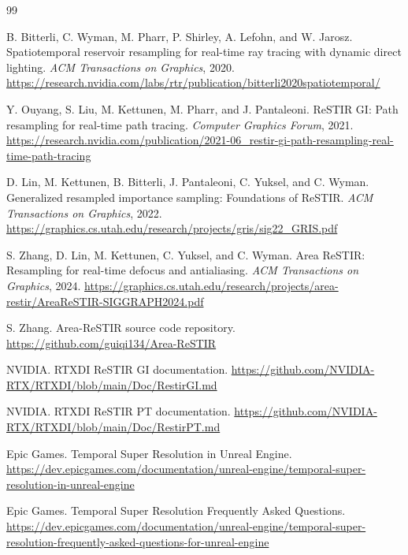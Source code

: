 \documentclass[11pt]{article}
\begin{document}
\clearpage
\begin{thebibliography}{99}
\small

B. Bitterli, C. Wyman, M. Pharr, P. Shirley, A. Lefohn, and W. Jarosz.
\newblock Spatiotemporal reservoir resampling for real-time ray tracing with dynamic direct lighting.
\newblock \emph{ACM Transactions on Graphics}, 2020.
\newblock \url{https://research.nvidia.com/labs/rtr/publication/bitterli2020spatiotemporal/}

Y. Ouyang, S. Liu, M. Kettunen, M. Pharr, and J. Pantaleoni.
\newblock ReSTIR GI: Path resampling for real-time path tracing.
\newblock \emph{Computer Graphics Forum}, 2021.
\newblock \url{https://research.nvidia.com/publication/2021-06_restir-gi-path-resampling-real-time-path-tracing}

D. Lin, M. Kettunen, B. Bitterli, J. Pantaleoni, C. Yuksel, and C. Wyman.
\newblock Generalized resampled importance sampling: Foundations of ReSTIR.
\newblock \emph{ACM Transactions on Graphics}, 2022.
\newblock \url{https://graphics.cs.utah.edu/research/projects/gris/sig22_GRIS.pdf}

S. Zhang, D. Lin, M. Kettunen, C. Yuksel, and C. Wyman.
\newblock Area ReSTIR: Resampling for real-time defocus and antialiasing.
\newblock \emph{ACM Transactions on Graphics}, 2024.
\newblock \url{https://graphics.cs.utah.edu/research/projects/area-restir/AreaReSTIR-SIGGRAPH2024.pdf}

S. Zhang.
\newblock Area-ReSTIR source code repository.
\newblock \url{https://github.com/guiqi134/Area-ReSTIR}

NVIDIA.
\newblock RTXDI ReSTIR GI documentation.
\newblock \url{https://github.com/NVIDIA-RTX/RTXDI/blob/main/Doc/RestirGI.md}

NVIDIA.
\newblock RTXDI ReSTIR PT documentation.
\newblock \url{https://github.com/NVIDIA-RTX/RTXDI/blob/main/Doc/RestirPT.md}

Epic Games.
\newblock Temporal Super Resolution in Unreal Engine.
\newblock \url{https://dev.epicgames.com/documentation/unreal-engine/temporal-super-resolution-in-unreal-engine}

Epic Games.
\newblock Temporal Super Resolution Frequently Asked Questions.
\newblock \url{https://dev.epicgames.com/documentation/unreal-engine/temporal-super-resolution-frequently-asked-questions-for-unreal-engine}


\end{thebibliography}
\end{document}
